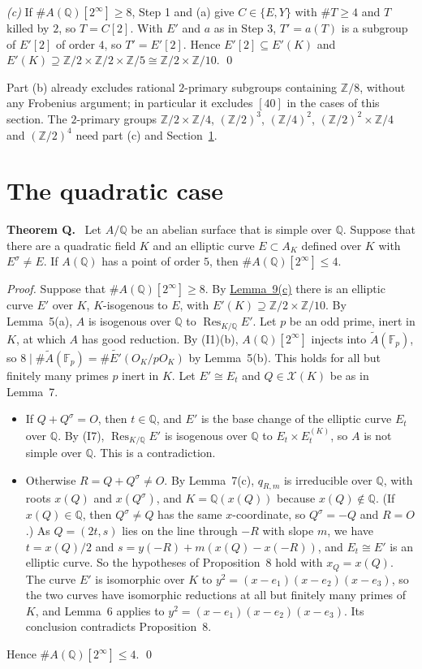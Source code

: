 \documentclass[11pt]{article}
\newenvironment{statement}[1]{\par\medskip\noindent\phantomsection\textbf{#1}\ }{\par\medskip}
\newcommand{\Q}{\mathbb Q}
\newcommand{\Z}{\mathbb Z}
\newcommand{\F}{\mathbb F}
\DeclareMathOperator{\Res}{Res}
\begin{document}
\emph{(c)} If \(\#A(\Q)[2^\infty]\ge8\), Step 1 and (a) give \(C\in\{E,Y\}\) with \(\#T\ge4\) and \(T\)
killed by \(2\), so \(T=C[2]\). With \(E'\) and \(a\) as in Step 3, \(T'=a(T)\) is a subgroup of \(E'[2]\) of order
\(4\), so \(T'=E'[2]\). Hence \(E'[2]\subseteq E'(K)\) and \(E'(K)\supseteq\Z/2\times\Z/2\times\Z/5\cong
\Z/2\times\Z/10\). \qed

\medskip
Part (b) already excludes rational \(2\)-primary subgroups containing \(\Z/8\), without any Frobenius
argument; in particular it excludes \([40]\) in the cases of this section. The \(2\)-primary groups
\(\Z/2\times\Z/4\), \((\Z/2)^3\), \((\Z/4)^2\), \((\Z/2)^2\times\Z/4\) and \((\Z/2)^4\) need part (c) and
Section~\ref{quadratic}.

\section{The quadratic case}\label{quadratic}

\begin{statement}{Theorem Q.}\label{thm-Qprime}
Let \(A/\Q\) be an abelian surface that is simple over \(\Q\). Suppose that there are a quadratic
field \(K\) and an elliptic curve \(E\subset A_K\) defined over \(K\) with \(E^\sigma\neq E\). If
\(A(\Q)\) has a point of order \(5\), then \(\#A(\Q)[2^\infty]\le4\).
\end{statement}

\emph{Proof.} Suppose that \(\#A(\Q)[2^\infty]\ge8\). By
\hyperref[lemma-4prime]{Lemma~9(c)} there is an elliptic curve \(E'\) over \(K\), \(K\)-isogenous
to \(E\), with \(E'(K)\supseteq\Z/2\times\Z/10\). By Lemma~5(a), \(A\) is isogenous over \(\Q\) to
\(\Res_{K/\Q}E'\). Let \(p\) be an odd prime, inert in \(K\), at which \(A\) has good reduction. By
(I1)(b), \(A(\Q)[2^\infty]\) injects into \(\widetilde A(\F_p)\), so
\(8\mid\#\widetilde A(\F_p)=\#\widetilde{E'}(O_K/pO_K)\) by Lemma~5(b). This holds for all but
finitely many primes \(p\) inert in \(K\). Let \(E'\cong E_t\) and \(Q\in\mathcal X(K)\) be as in
Lemma~7.
\begin{itemize}
\item If \(Q+Q^\sigma=O\), then \(t\in\Q\), and \(E'\) is the base change of the elliptic curve
\(E_t\) over \(\Q\). By (I7), \(\Res_{K/\Q}E'\) is isogenous over \(\Q\) to \(E_t\times E_t^{(K)}\),
so \(A\) is not simple over \(\Q\). This is a contradiction.
\item Otherwise \(R=Q+Q^\sigma\neq O\). By Lemma~7(c), \(q_{R,m}\) is irreducible over \(\Q\), with
roots \(x(Q)\) and \(x(Q^\sigma)\), and \(K=\Q(x(Q))\) because \(x(Q)\notin\Q\). (If \(x(Q)\in\Q\), then
\(Q^\sigma\neq Q\) has the same \(x\)-coordinate, so \(Q^\sigma=-Q\) and \(R=O\).) As \(Q=(2t,s)\) lies on
the line through \(-R\) with slope \(m\), we have \(t=x(Q)/2\) and \(s=y(-R)+m(x(Q)-x(-R))\), and
\(E_t\cong E'\) is an elliptic curve. So the hypotheses of Proposition~8 hold with \(x_Q=x(Q)\). The
curve \(E'\) is isomorphic over \(K\) to \(y^2=(x-e_1)(x-e_2)(x-e_3)\), so the two curves have
isomorphic reductions at all but finitely many primes of \(K\), and Lemma~6 applies to
\(y^2=(x-e_1)(x-e_2)(x-e_3)\). Its conclusion contradicts Proposition~8.
\end{itemize}
Hence \(\#A(\Q)[2^\infty]\le4\). \qed
\end{document}
